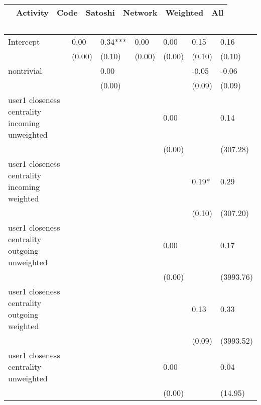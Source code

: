 \begin{table}
\caption{}
\begin{center}
\begin{tabular}{lcccccc}
\hline
                                               & Activity &   Code  & Satoshi & Network &   Weighted   &     All       \\
\hline
\hline
\end{tabular}
\begin{tabular}{lllllll}
Intercept                                      & 0.00     & 0.34*** & 0.00    & 0.00    & 0.15         & 0.16          \\
                                               & (0.00)   & (0.10)  & (0.00)  & (0.00)  & (0.10)       & (0.10)        \\
nontrivial                                     &          & 0.00    &         &         & -0.05        & -0.06         \\
                                               &          & (0.00)  &         &         & (0.09)       & (0.09)        \\
user1 closeness centrality incoming unweighted &          &         &         & 0.00    &              & 0.14          \\
                                               &          &         &         & (0.00)  &              & (307.28)      \\
user1 closeness centrality incoming weighted   &          &         &         &         & 0.19*        & 0.29          \\
                                               &          &         &         &         & (0.10)       & (307.20)      \\
user1 closeness centrality outgoing unweighted &          &         &         & 0.00    &              & 0.17          \\
                                               &          &         &         & (0.00)  &              & (3993.76)     \\
user1 closeness centrality outgoing weighted   &          &         &         &         & 0.13         & 0.33          \\
                                               &          &         &         &         & (0.09)       & (3993.52)     \\
user1 closeness centrality unweighted          &          &         &         & 0.00    &              & 0.04          \\
                                               &          &         &         & (0.00)  &              & (14.95)       \\

\end{tabular}
\end{center}
\end{table}
